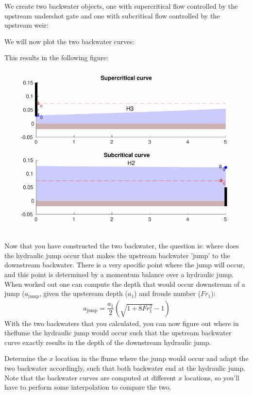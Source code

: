 \documentclass[a4paper]{article}
\begin{document}
\begin{solution}
  We create two backwater objects, one with supercritical flow controlled by the upstream undershot gate and one with subcritical flow controlled by the upstream weir:
  
  
  
  We will now plot the two backwater curves:
  
  
  
  This results in the following figure:
  
  \includegraphics[width=\linewidth]{matlab/hyd_jump_curves.pdf}
\end{solution}

Now that you have constructed the two backwater, the question is: where does the hydraulic jump occur that makes the upstream backwater 'jump' to the downstream backwater. There is a very specific point where the jump will occur, and this point is determined by a momentum balance over a hydraulic jump. When worked out one can compute the depth  that would occur downstream of a jump ($a_\text{jump}$, given the upsteream depth ($a_1$) and froude number ($Fr_1$):
\begin{align*}
  a_\text{jump}=\dfrac{a_1}{2}(\sqrt{1+8Fr_1^2}-1)
\end{align*}
With the two backwaters that you calculated, you can now figure out where in theflume the hydraulic jump would occur such that the upstream backwater curve exactly results in the depth of the downstream hydraulic jump.

\begin{exercise}
  Determine the $x$ location in the flume where the jump would occur and adapt the two backwater accordingly, such that both backwater end at the hydraulic jump. Note that the backwater curves are computed at different $x$ locations, so you'll have to perform some interpolation to compare the two.
\end{exercise}
\end{document}
